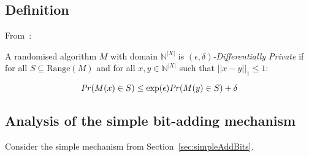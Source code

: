 \documentclass[10pt,a4paper]{article}
\begin{document}
\subsection{Definition}

From~\cite{dwork2014algorithmic}:

\begin{defn} 
A randomised algorithm $M$ with domain $\mathbb{N}^|X|$ is \emph{$(\epsilon,\delta)$-Differentially Private} 
if for all $S \subseteq \text{Range}(M)$ and for all $x,y \in \mathbb{N}^|X|$ such that $|| x-y||_1 \leq 1:$

$$ \mathit{Pr} (M(x) \in S) \leq \exp(\epsilon) \mathit{Pr}(M(y) \in S)+ \delta$$
\end{defn}

\subsection{Analysis of the simple bit-adding mechanism}
Consider the simple mechanism from Section~\ref{sec:simpleAddBits}.
\end{document}
